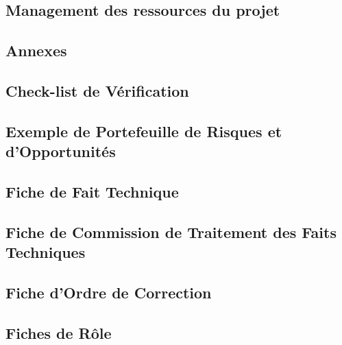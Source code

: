 \documentclass[asi]{picInsa}
\begin{document}
\chapter{Management des ressources du projet}
\label{ressources}

 
\begin{appendix}
\part*{Annexes}

\chapter{Check-list de Vérification}
\label{annexeCheckList}





\chapter{Exemple de Portefeuille de Risques et d'Opportunités}

\newpage

\label{annexeFRi}

\newpage
\label{annexeFO}

\newpage


\chapter{Fiche de Fait Technique}
\label{annexeFFT}


\chapter{Fiche de Commission de Traitement des Faits Techniques}
\label{annexeFCTFT}


\chapter{Fiche d'Ordre de Correction}
\label{annexeFOC}


\chapter{Fiches de Rôle}
\label{annexeFRo}
	


\end{appendix}
\end{document}
